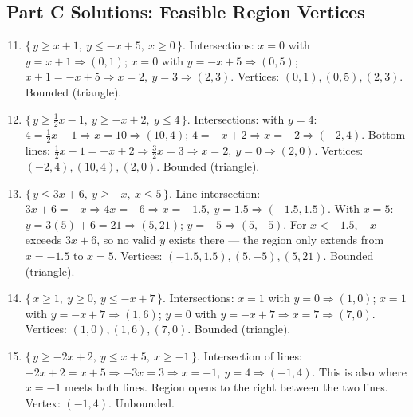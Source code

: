 \documentclass[14pt]{extarticle}
\begin{document}
\subsection*{Part C Solutions: Feasible Region Vertices}
\begin{enumerate}
  \setcounter{enumi}{10}
  \item \(\{\,y\ge x+1,\ y\le -x+5,\ x\ge0\,\}\).  
  Intersections:  
  \(x=0\) with \(y=x+1 \Rightarrow (0,1)\); \(x=0\) with \(y=-x+5 \Rightarrow (0,5)\);  
  \(x+1=-x+5 \Rightarrow x=2,\ y=3 \Rightarrow (2,3)\).  
  Vertices: \((0,1), (0,5), (2,3)\). Bounded (triangle).

  \item \(\{\,y\ge \tfrac12 x-1,\ y\ge -x+2,\ y\le4\,\}\).  
  Intersections: with \(y=4\): \(4=\tfrac12 x-1 \Rightarrow x=10 \Rightarrow (10,4)\); \(4=-x+2 \Rightarrow x=-2 \Rightarrow (-2,4)\).  
  Bottom lines: \(\tfrac12 x-1=-x+2 \Rightarrow \tfrac32 x=3 \Rightarrow x=2,\ y=0 \Rightarrow (2,0)\).  
  Vertices: \((-2,4), (10,4), (2,0)\). Bounded (triangle).

  \item \(\{\,y\le 3x+6,\ y\ge -x,\ x\le5\,\}\).  
  Line intersection: \(3x+6=-x \Rightarrow 4x=-6 \Rightarrow x=-1.5,\ y=1.5 \Rightarrow (-1.5,1.5)\).  
  With \(x=5\): \(y=3(5)+6=21 \Rightarrow (5,21)\); \(y=-5 \Rightarrow (5,-5)\).  
  For \(x<-1.5\), \(-x\) exceeds \(3x+6\), so no valid \(y\) exists there — the region only extends from \(x=-1.5\) to \(x=5\).
  Vertices: \((-1.5,1.5), (5,-5), (5,21)\). Bounded (triangle).

  \item \(\{\,x\ge1,\ y\ge0,\ y\le -x+7\,\}\).  
  Intersections: \(x=1\) with \(y=0 \Rightarrow (1,0)\); \(x=1\) with \(y=-x+7 \Rightarrow (1,6)\);  
  \(y=0\) with \(y=-x+7 \Rightarrow x=7 \Rightarrow (7,0)\).  
  Vertices: \((1,0), (1,6), (7,0)\). Bounded (triangle).

  \item \(\{\,y\ge -2x+2,\ y\le x+5,\ x\ge -1\,\}\).  
  Intersection of lines: \(-2x+2=x+5 \Rightarrow -3x=3 \Rightarrow x=-1,\ y=4 \Rightarrow (-1,4)\).  
  This is also where \(x=-1\) meets both lines. Region opens to the right between the two lines.  
  Vertex: \((-1,4)\). Unbounded.
\end{enumerate}
\end{document}
